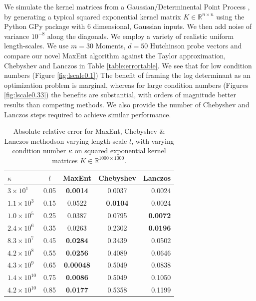 \documentclass[letterpaper]{article} %
\begin{document}
We simulate the kernel matrices from a Gaussian/Determinental Point Process \cite{Rasmussen2006}, by generating a typical squared exponential kernel matrix $K \in \mathbb{R}^{n \times n}$ using the Python GPy package with $6$ dimensional, Gaussian inputs. We then add noise of variance $10^{-8}$ along the diagonals. We employ a variety of realistic uniform length-scales. We use $m=30$ Moments, $d=50$ Hutchinson probe vectors and compare our novel MaxEnt algorithm against the Taylor approximation, Chebyshev \cite{han2015large} and Lanczos \cite{ubaru2017fast} in Table \ref{table:errortable}. We see that for low condition numbers (Figure \ref{fig:lscale0.1}) The benefit of framing the log determinant as an optimization problem is marginal, whereas for large condition numbers (Figures \ref{fig:lscale0.33}) the benefits are substantial, with orders of magnitude better results than competing methods. We also provide the number of Chebyshev and Lanczos steps required to achieve similar performance. 
\begin{table}[t]
	\label{table:errortable}
	\caption{Absolute relative error for MaxEnt, Chebyshev \& Lanczos methodson varying length-scale $l$, with varying condition number $\kappa$ on squared exponential kernel matrices $K \in \mathbb{R}^{1000\times 1000}$.}
	\label{sample-table}
	\vskip 0.15in
	\begin{center}
		\begin{small}
			\begin{sc}
				\begin{tabular}{lcccr}
					\toprule
					$\kappa$ & $l$ & MaxEnt & Chebyshev & Lanczos \\
					\midrule
					$3\times10^{1}$    & 0.05& \bf{0.0014}& 0.0037 & 0.0024 \\
					$1.1\times10^{3}$ & 0.15& 0.0522& \bf{0.0104} & 0.0024\\
					$1.0\times10^{5}$    & 0.25& 0.0387& 0.0795 & \bf{0.0072} \\
					$2.4\times10^{6}$    & 0.35& 0.0263& 0.2302    & \bf{0.0196}    \\
					$8.3\times10^{7}$     & 0.45& \bf{0.0284}& 0.3439 & 0.0502\\
					$4.2\times10^{8}$     & 0.55&
					\bf{0.0256}& 0.4089 & 0.0646\\
					$4.3\times10^{9}$     & 0.65&
					\bf{0.00048}& 0.5049 & 0.0838\\
					$1.4\times10^{10}$     & 0.75& \bf{0.0086}& 0.5049  &0.1050       \\
					$4.2\times10^{10}$   & 0.85& \bf{0.0177}& 0.5358 &0.1199\\
					\bottomrule
				\end{tabular}
			\end{sc}
		\end{small}
	\end{center}
	\vskip -0.1in
\end{table}
\end{document}
